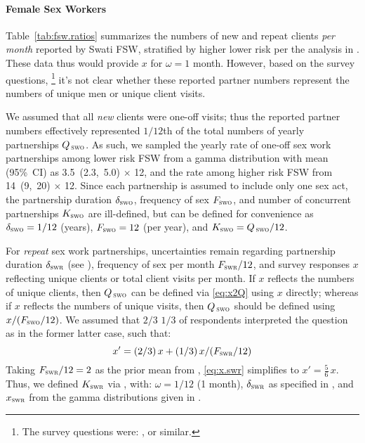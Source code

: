 \paragraph{Female Sex Workers}
Table~\ref{tab:fsw.ratios} summarizes
the numbers of new and repeat clients \emph{per month} reported by Swati FSW,
stratified by higher \vs lower risk per the analysis in .
These data thus would provide $x$ for $\omega = 1$ month.
However, based on the survey questions,%
\footnote{The survey questions were: , or similar.}
it's not clear whether these reported partner numbers
represent the numbers of unique men or unique client visits.
\par
We assumed that all \emph{new} clients were one-off visits;
thus the reported partner numbers effectively represented
$1/12$th of the total numbers of yearly partnerships $Q_{\,\textsc{swo}}$.
As such, we sampled the yearly rate of one-off sex work partnerships among lower risk FSW
from a gamma distribution with mean (95\%~CI) as 3.5~(2.3,~5.0) $\times$ 12,
and the rate among higher risk FSW from 14~(9,~20) $\times$ 12.
Since each partnership is assumed to include only one sex act,
the partnership duration $\delta_{\textsc{swo}}$, frequency of sex $F_{\textsc{swo}}$,
and number of concurrent partnerships $K_{\textsc{swo}}$ are ill-defined,
but can be defined for convenience as
$\delta_{\textsc{swo}} = 1/12$ (years), $F_{\textsc{swo}} = 12$ (per year),
and $K_{\textsc{swo}} = Q_{\,\textsc{swo}} / 12$.
\par
For \emph{repeat} sex work partnerships, uncertainties remain regarding
partnership duration $\delta_{\textsc{swr}}$ (see ),
frequency of sex per month $F_{\textsc{swr}}/12$, and
survey responses $x$ reflecting unique clients or total client visits per month.
If $x$ reflects the numbers of unique clients, then
$Q_{\,\textsc{swo}}$ can be defined via \eqref{eq:x2Q} using $x$ directly;
whereas if $x$ reflects the numbers of unique visits, then
$Q_{\,\textsc{swo}}$ should be defined using $x/(F_{\textsc{swo}}/12)$.
We assumed that $2/3$ \vs $1/3$ of respondents interpreted the question
as in the former \vs latter case, such that:
\begin{equation}\label{eq:x.swr}
  x' = (2/3)\,x + (1/3)\,x/(F_{\textsc{swr}}/12)
\end{equation}
Taking $F_{\textsc{swr}}/12 = 2$ as the prior mean from ,
\eqref{eq:x.swr} simplifies to $x' = \frac{5}{6}\,x$.
Thus, we defined $K_{\textsc{swr}}$ via , with:
$\omega = 1/12$ (1 month),
$\delta_{\textsc{swr}}$ as specified in , and
$x_{\textsc{swr}}$ from the gamma distributions given in .
